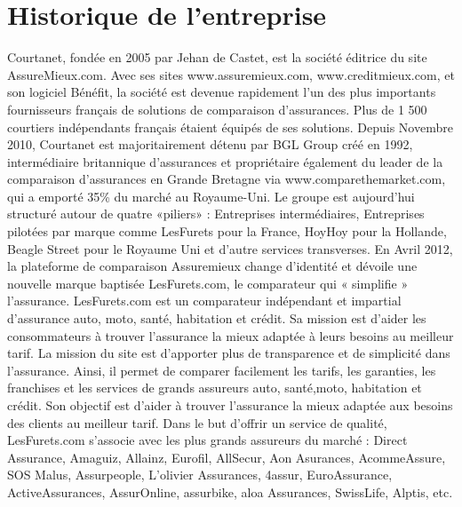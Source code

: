 \section{Historique de l'entreprise}
Courtanet, fondée en 2005 par Jehan de Castet, est la société éditrice du site AssureMieux.com. Avec ses sites www.assuremieux.com, www.creditmieux.com, et son logiciel Bénéfit, la société est devenue rapidement l’un des plus importants fournisseurs français de solutions de comparaison d’assurances. Plus de 1 500 courtiers indépendants français étaient équipés de ses solutions. Depuis Novembre 2010, Courtanet est majoritairement détenu par BGL Group créé en 1992, intermédiaire britannique d’assurances et propriétaire également du leader de la comparaison d’assurances en Grande Bretagne via www.comparethemarket.com, qui a emporté 35\% du marché au Royaume-Uni. Le groupe est aujourd’hui structuré autour de quatre «piliers» : Entreprises intermédiaires, Entreprises pilotées par marque comme LesFurets pour la France, HoyHoy pour la Hollande, Beagle Street pour le Royaume Uni et d'autre services transverses. En Avril 2012, la plateforme de comparaison Assuremieux change d’identité et dévoile une nouvelle marque baptisée LesFurets.com, le comparateur qui « simplifie » l’assurance. LesFurets.com est un comparateur indépendant et impartial d’assurance auto, moto, santé, habitation et crédit. Sa mission est d’aider les consommateurs à trouver l’assurance la mieux adaptée à leurs besoins au meilleur tarif. La mission du site est d’apporter plus de transparence et de simplicité dans l’assurance. Ainsi, il permet de comparer facilement les tarifs, les garanties, les franchises et les services de grands assureurs auto, santé,moto, habitation et crédit. Son objectif est d’aider à trouver l’assurance la mieux adaptée aux besoins des clients au meilleur tarif. Dans le but d’offrir un service de qualité, LesFurets.com s’associe avec les plus grands assureurs du marché : Direct Assurance, Amaguiz, Allainz, Eurofil, AllSecur, Aon Asurances, AcommeAssure, SOS Malus, Assurpeople, L’olivier Assurances, 4assur, EuroAssurance, ActiveAssurances, AssurOnline, assurbike, aloa Assurances, SwissLife, Alptis, etc.
